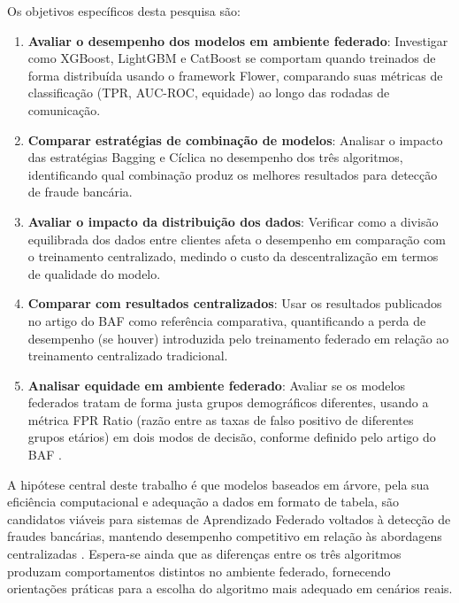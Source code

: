 Os objetivos específicos desta pesquisa são:

\begin{enumerate}
    \item \textbf{Avaliar o desempenho dos modelos em ambiente federado}: Investigar como XGBoost, LightGBM e CatBoost se comportam quando treinados de forma distribuída usando o framework Flower, comparando suas métricas de classificação (TPR, AUC-ROC, equidade) ao longo das rodadas de comunicação.

    \item \textbf{Comparar estratégias de combinação de modelos}: Analisar o impacto das estratégias Bagging e Cíclica no desempenho dos três algoritmos, identificando qual combinação produz os melhores resultados para detecção de fraude bancária.

    \item \textbf{Avaliar o impacto da distribuição dos dados}: Verificar como a divisão equilibrada dos dados entre clientes afeta o desempenho em comparação com o treinamento centralizado, medindo o custo da descentralização em termos de qualidade do modelo.

    \item \textbf{Comparar com resultados centralizados}: Usar os resultados publicados no artigo do BAF como referência comparativa, quantificando a perda de desempenho (se houver) introduzida pelo treinamento federado em relação ao treinamento centralizado tradicional.

    \item \textbf{Analisar equidade em ambiente federado}: Avaliar se os modelos federados tratam de forma justa grupos demográficos diferentes, usando a métrica FPR Ratio (razão entre as taxas de falso positivo de diferentes grupos etários) em dois modos de decisão, conforme definido pelo artigo do BAF \cite{jesus2022baf}.
\end{enumerate}

A hipótese central deste trabalho é que modelos baseados em árvore, pela sua eficiência computacional e adequação a dados em formato de tabela, são candidatos viáveis para sistemas de Aprendizado Federado voltados à detecção de fraudes bancárias, mantendo desempenho competitivo em relação às abordagens centralizadas \cite{cheng2021secureboost, lynch2024fraud}. Espera-se ainda que as diferenças entre os três algoritmos produzam comportamentos distintos no ambiente federado, fornecendo orientações práticas para a escolha do algoritmo mais adequado em cenários reais.

